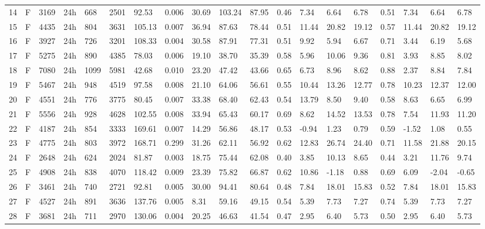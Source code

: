 \begin{tabular}{rllllllrlllllllllll}
14 & F & 3169 & 24h & 668 & 2501 & 92.53 & 0.006 & 30.69 & 103.24 & 87.95 & 0.46 & 7.34 & 6.64 & 6.78 & 0.51 & 7.34 & 6.64 & 6.78 \\
15 & F & 4435 & 24h & 804 & 3631 & 105.13 & 0.007 & 36.94 & 87.63 & 78.44 & 0.51 & 11.44 & 20.82 & 19.12 & 0.57 & 11.44 & 20.82 & 19.12 \\
16 & F & 3927 & 24h & 726 & 3201 & 108.33 & 0.004 & 30.58 & 87.91 & 77.31 & 0.51 & 9.92 & 5.94 & 6.67 & 0.71 & 3.44 & 6.19 & 5.68 \\
17 & F & 5275 & 24h & 890 & 4385 & 78.03 & 0.006 & 19.10 & 38.70 & 35.39 & 0.58 & 5.96 & 10.06 & 9.36 & 0.81 & 3.93 & 8.85 & 8.02 \\
18 & F & 7080 & 24h & 1099 & 5981 & 42.68 & 0.010 & 23.20 & 47.42 & 43.66 & 0.65 & 6.73 & 8.96 & 8.62 & 0.88 & 2.37 & 8.84 & 7.84 \\
19 & F & 5467 & 24h & 948 & 4519 & 97.58 & 0.008 & 21.10 & 64.06 & 56.61 & 0.55 & 10.44 & 13.26 & 12.77 & 0.78 & 10.23 & 12.37 & 12.00 \\
20 & F & 4551 & 24h & 776 & 3775 & 80.45 & 0.007 & 33.38 & 68.40 & 62.43 & 0.54 & 13.79 & 8.50 & 9.40 & 0.58 & 8.63 & 6.65 & 6.99 \\
21 & F & 5556 & 24h & 928 & 4628 & 102.55 & 0.008 & 33.94 & 65.43 & 60.17 & 0.69 & 8.62 & 14.52 & 13.53 & 0.78 & 7.54 & 11.93 & 11.20 \\
22 & F & 4187 & 24h & 854 & 3333 & 169.61 & 0.007 & 14.29 & 56.86 & 48.17 & 0.53 & -0.94 & 1.23 & 0.79 & 0.59 & -1.52 & 1.08 & 0.55 \\
23 & F & 4775 & 24h & 803 & 3972 & 168.71 & 0.299 & 31.26 & 62.11 & 56.92 & 0.62 & 12.83 & 26.74 & 24.40 & 0.71 & 11.58 & 21.88 & 20.15 \\
24 & F & 2648 & 24h & 624 & 2024 & 81.87 & 0.003 & 18.75 & 75.44 & 62.08 & 0.40 & 3.85 & 10.13 & 8.65 & 0.44 & 3.21 & 11.76 & 9.74 \\
25 & F & 4908 & 24h & 838 & 4070 & 118.42 & 0.009 & 23.39 & 75.82 & 66.87 & 0.62 & 10.86 & -1.18 & 0.88 & 0.69 & 6.09 & -2.04 & -0.65 \\
26 & F & 3461 & 24h & 740 & 2721 & 92.81 & 0.005 & 30.00 & 94.41 & 80.64 & 0.48 & 7.84 & 18.01 & 15.83 & 0.52 & 7.84 & 18.01 & 15.83 \\
27 & F & 4527 & 24h & 891 & 3636 & 137.76 & 0.005 & 8.31 & 59.16 & 49.15 & 0.54 & 5.39 & 7.73 & 7.27 & 0.74 & 5.39 & 7.73 & 7.27 \\
28 & F & 3681 & 24h & 711 & 2970 & 130.06 & 0.004 & 20.25 & 46.63 & 41.54 & 0.47 & 2.95 & 6.40 & 5.73 & 0.50 & 2.95 & 6.40 & 5.73 \\

\end{tabular}
